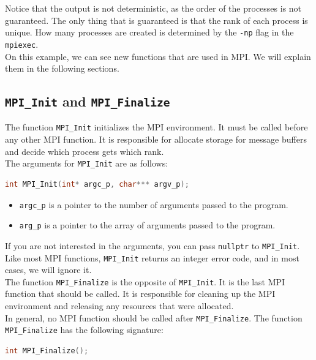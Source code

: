 Notice that the output is not deterministic, as the order of the processes is not
guaranteed. The only thing that is guaranteed is that the rank of each process is unique.
How many processes are created is determined by the \texttt{-np} flag in the \texttt{mpiexec}.\\

On this example, we can see new functions that are used in MPI. We will explain them in the
following sections.

\subsection{ \texttt{MPI\_Init} and \texttt{MPI\_Finalize}}

The function \texttt{MPI\_Init} initializes the MPI environment. It must be called before
any other MPI function. It is responsible for allocate storage for message buffers and decide
which process gets which rank.\\

The arguments for \texttt{MPI\_Init} are as follows:
\begin{lstlisting}[language=C++]
int MPI_Init(int* argc_p, char*** argv_p);
\end{lstlisting}

\begin{itemize}
    \item \texttt{argc\_p} is a pointer to the number of arguments passed to the program.
    \item \texttt{arg\_p} is a pointer to the array of arguments passed to the program.
\end{itemize}

If you are not interested in the arguments, you can pass \texttt{nullptr} to \texttt{MPI\_Init}.
Like most MPI functions, \texttt{MPI\_Init} returns an integer error code, and in most cases,
we will ignore it.\\

The function \texttt{MPI\_Finalize} is the opposite of \texttt{MPI\_Init}. It is the last MPI
function that should be called. It is responsible for cleaning up the MPI environment and
releasing any resources that were allocated.\\

In general, no MPI function should be called after \texttt{MPI\_Finalize}. The function
\texttt{MPI\_Finalize} has the following signature:

\begin{lstlisting}[language=C++]
int MPI_Finalize();
\end{lstlisting}

